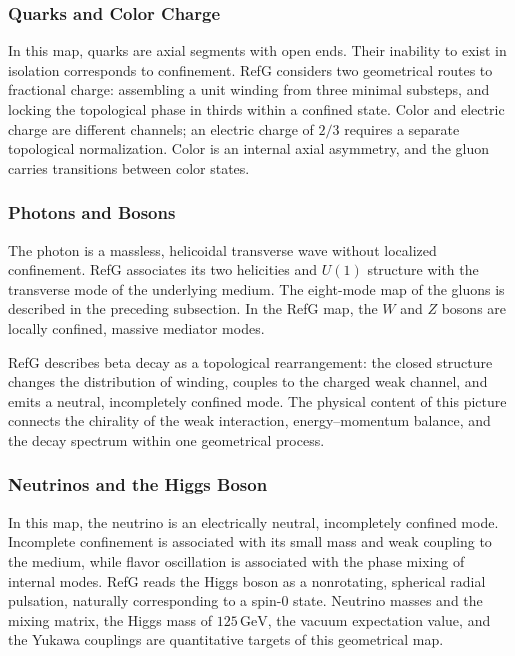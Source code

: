 \documentclass[11pt,a4paper]{article}
\begin{document}
\subsubsection{Quarks and Color Charge}

In this map, quarks are axial segments with open ends. Their inability to exist in isolation corresponds to confinement. RefG considers two geometrical routes to fractional charge: assembling a unit winding from three minimal substeps, and locking the topological phase in thirds within a confined state. Color and electric charge are different channels; an electric charge of $2/3$ requires a separate topological normalization. Color is an internal axial asymmetry, and the gluon carries transitions between color states.

\subsubsection{Photons and Bosons}

The photon is a massless, helicoidal transverse wave without localized confinement. RefG associates its two helicities and $U(1)$ structure with the transverse mode of the underlying medium. The eight-mode map of the gluons is described in the preceding subsection. In the RefG map, the $W$ and $Z$ bosons are locally confined, massive mediator modes.

RefG describes beta decay as a topological rearrangement: the closed structure changes the distribution of winding, couples to the charged weak channel, and emits a neutral, incompletely confined mode. The physical content of this picture connects the chirality of the weak interaction, energy--momentum balance, and the decay spectrum within one geometrical process.

\subsubsection{Neutrinos and the Higgs Boson}

In this map, the neutrino is an electrically neutral, incompletely confined mode. Incomplete confinement is associated with its small mass and weak coupling to the medium, while flavor oscillation is associated with the phase mixing of internal modes. RefG reads the Higgs boson as a nonrotating, spherical radial pulsation, naturally corresponding to a spin-0 state. Neutrino masses and the mixing matrix, the Higgs mass of $125\,\mathrm{GeV}$, the vacuum expectation value, and the Yukawa couplings are quantitative targets of this geometrical map.
\end{document}
